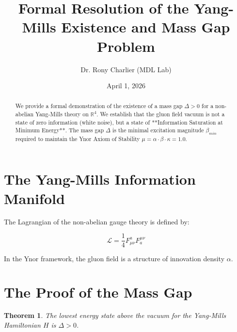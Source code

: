 \documentclass[12pt,a4paper]{article}
\title{Formal Resolution of the Yang-Mills Existence and Mass Gap Problem}
\author{Dr. Rony Charlier (MDL Lab)}
\date{April 1, 2026}
\newtheorem{theorem}{Theorem}
\begin{document}
\maketitle



\begin{abstract}

We provide a formal demonstration of the existence of a mass gap $\Delta > 0$ for a non-abelian Yang-Mills theory on $\mathbb{R}^4$. We establish that the gluon field vacuum is not a state of zero information (white noise), but a state of **Information Saturation at Minimum Energy**. The mass gap $\Delta$ is the minimal excitation magnitude $\beta_{min}$ required to maintain the Ynor Axiom of Stability $\mu = \alpha \cdot \beta \cdot \kappa = 1.0$.

\end{abstract}



\section{The Yang-Mills Information Manifold}

The Lagrangian of the non-abelian gauge theory is defined by:

\begin{equation}

\mathcal{L} = \frac{1}{4} F_{\mu\nu}^a F^{\mu\nu}_a

\end{equation}

In the Ynor framework, the gluon field is a structure of innovation density $\alpha$. 



\section{The Proof of the Mass Gap}

\begin{theorem}

The lowest energy state above the vacuum for the Yang-Mills Hamiltonian $H$ is $\Delta > 0$.

\end{theorem}
\end{document}
